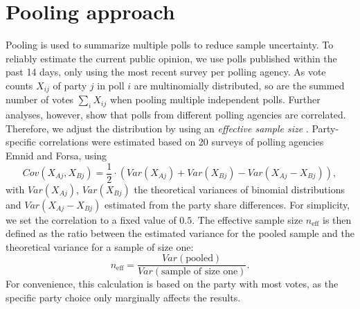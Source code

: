 \documentclass[smallcondensed]{svjour3}     %
\begin{document}
\section{Pooling approach} \label{sec:pooling}
Pooling is used to summarize multiple polls to reduce sample uncertainty.
To reliably estimate the current public opinion, we use polls published within the past 14 days, only using the most recent survey per polling agency.
As vote counts $X_{ij}$ of party $j$ in poll $i$ are multinomially distributed, so are the summed number of votes $\sum_i X_{ij}$ when pooling multiple independent polls.
Further analyses, however, show that polls from different
polling agencies are correlated.
Therefore, we adjust the
distribution by using an \textit{effective sample size} \citep{hanley_2003}.
Party-specific correlations were estimated based on
20 surveys of polling agencies Emnid and Forsa, using
$$
Cov(X_{Aj}, X_{Bj}) = \frac{1}{2} \cdot \left(Var(X_{Aj}) + Var(X_{Bj}) - Var(X_{Aj} - X_{Bj}) \right),
$$
with $Var(X_{Aj})$, $Var(X_{Bj})$ the theoretical variances of binomial distributions and $Var(X_{Aj} - X_{Bj})$ estimated from the party share differences.
For simplicity, we set the correlation to a fixed value of $0.5$.
The effective sample size $n_{\text{eff}}$ is then defined as the ratio between
the estimated variance for the pooled sample and the theoretical variance for a
sample of size one:
$$
n_{\text{eff}} = \frac{Var(\text{pooled})}{Var(\text{sample of size one})}.
$$
For convenience, this calculation is based on the party with most votes,
as the specific party choice only marginally affects the results.
\end{document}
